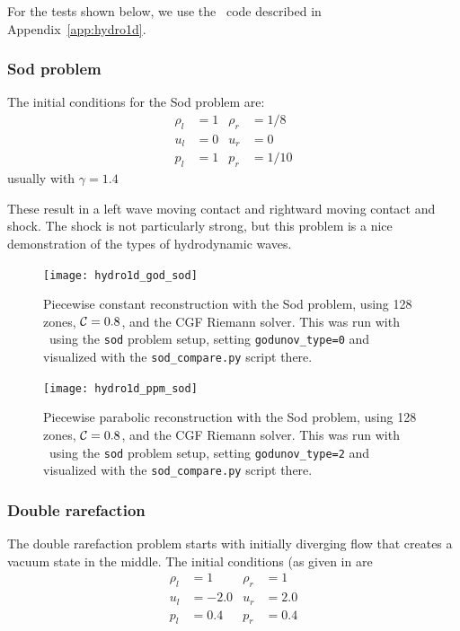 For the tests shown below, we use the \hydrooned\ code described in
Appendix~\ref{app:hydro1d}.

\subsubsection{Sod problem}

The initial conditions for the Sod problem \cite{sod:1978} are:
\begin{align}
\rho_l &= 1      &  \rho_r &= 1/8 \nonumber \\
u_l   &= 0       &  u_r    &= 0   \\
p_l    &= 1      &  p_r    &= 1/10 \nonumber
\end{align}
usually with $\gamma = 1.4$

These result in a left wave moving contact and rightward moving
contact and shock.  The shock is not particularly strong, but this
problem is a nice demonstration of the types of hydrodynamic waves.

\begin{figure}[t]
\centering
\texttt{[image: hydro1d\_god\_sod]}
\caption[Piecewise constant reconstruction Sod problem]{\label{fig:Euler:sod:god} Piecewise constant reconstruction
  with the Sod problem, using 128 zones, ${\mathcal{C}} = 0.8$, and the CGF
  Riemann solver.  This was run with \hydrooned\ using the {\tt sod}
  problem setup, setting {\tt godunov\_type=0} and visualized with the
  {\tt sod\_compare.py} script there.}
\end{figure}

\begin{figure}[t]
\centering
\texttt{[image: hydro1d\_ppm\_sod]}
\caption[Piecewise parabolic reconstruction Sod problem]{\label{fig:Euler:sod:ppm} Piecewise parabolic reconstruction
  with the Sod problem, using 128 zones, ${\mathcal{C}} = 0.8$, and the CGF
  Riemann solver.  This was run with \hydrooned\ using the {\tt sod}
  problem setup, setting {\tt godunov\_type=2} and visualized with the
  {\tt sod\_compare.py} script there.}
\end{figure}


\subsubsection{Double rarefaction}

The double rarefaction problem starts with initially diverging flow
that creates a vacuum state in the middle.  The initial conditions (as
given in \cite{toro:1997} are
\begin{align}
\rho_l &= 1      &  \rho_r &= 1 \nonumber \\
u_l    &= -2.0   &  u_r    &= 2.0   \\
p_l    &= 0.4    &  p_r    &= 0.4 \nonumber
\end{align}



